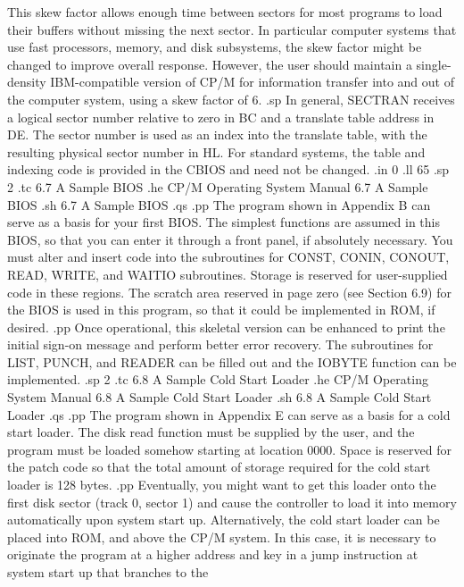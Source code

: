 This skew factor allows enough time between
sectors for most programs to load their buffers
without missing the next sector.  In particular
computer systems that use fast processors,
memory, and disk subsystems, the skew factor might
be changed to improve overall response.
However, the user should maintain a single-density
IBM-compatible version of CP/M for
information transfer into and out of the
computer system, using a skew factor of 6.
.sp
In general, SECTRAN receives a logical sector
number relative to zero in BC and a translate
table address in DE.  The sector number is used
as an index into the translate table, with the
resulting physical sector number
in HL.  For standard systems, the table and
indexing code is provided in the CBIOS and
need not be changed.
.in 0
.ll 65
.sp 2
.tc    6.7  A Sample BIOS
.he CP/M Operating System Manual                   6.7  A Sample BIOS
.sh
6.7  A Sample BIOS
.qs
.pp
The program shown in Appendix B can serve as a basis for your 
first BIOS.  The simplest functions are assumed in this BIOS, so 
that you can enter it through a front panel, if absolutely 
necessary.  You must alter and insert code into the 
subroutines for CONST, CONIN, CONOUT, READ, WRITE, and WAITIO 
subroutines.  Storage is reserved for user-supplied code in these 
regions.  The scratch area reserved in page zero (see Section 
6.9) for the BIOS is used in this program, so that it could be 
implemented in ROM, if desired.
.pp
Once operational, this skeletal version can be enhanced to print 
the initial sign-on message and perform better error recovery.  
The subroutines for LIST, PUNCH, and READER can be filled out and 
the IOBYTE function can be implemented.
.sp 2
.tc    6.8  A Sample Cold Start Loader
.he CP/M Operating System Manual      6.8  A Sample Cold Start Loader
.sh
6.8  A Sample Cold Start Loader
.qs
.pp
The program shown in Appendix E can serve as a basis for a cold 
start loader.  The disk read function must be supplied by the 
user, and the program must be loaded somehow starting at location 
0000.  Space is reserved for the patch code so that the total 
amount of storage required for the cold start loader is 128 
bytes.
.pp
Eventually, you might want to get this 
loader onto the first disk sector (track 0, sector 1) and cause 
the controller to load it into memory automatically upon system 
start up.  Alternatively, the cold start loader can be placed 
into ROM, and above the CP/M system.  In this case, it is 
necessary to originate the program at a higher address and key in 
a jump instruction at system start up that branches to the 
